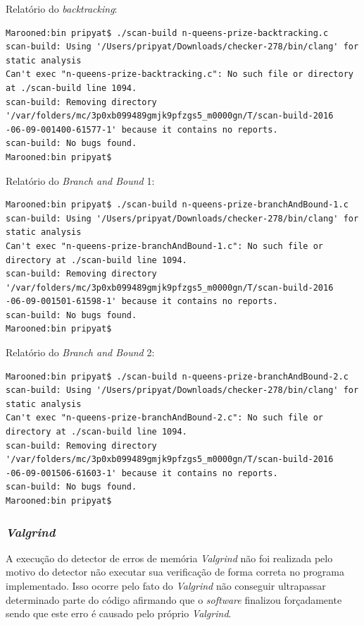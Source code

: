 \documentclass[12pt]{article}
\begin{document}
		Relatório do \textit{backtracking}:
{\scriptsize
\begin{verbatim}
Marooned:bin pripyat$ ./scan-build n-queens-prize-backtracking.c
scan-build: Using '/Users/pripyat/Downloads/checker-278/bin/clang' for static analysis
Can't exec "n-queens-prize-backtracking.c": No such file or directory at ./scan-build line 1094.
scan-build: Removing directory '/var/folders/mc/3p0xb099489gmjk9pfzgs5_m0000gn/T/scan-build-2016
-06-09-001400-61577-1' because it contains no reports.
scan-build: No bugs found.
Marooned:bin pripyat$
\end{verbatim}
}
		Relatório do \textit{Branch and Bound} 1:
{\scriptsize
\begin{verbatim}
Marooned:bin pripyat$ ./scan-build n-queens-prize-branchAndBound-1.c
scan-build: Using '/Users/pripyat/Downloads/checker-278/bin/clang' for static analysis
Can't exec "n-queens-prize-branchAndBound-1.c": No such file or directory at ./scan-build line 1094.
scan-build: Removing directory '/var/folders/mc/3p0xb099489gmjk9pfzgs5_m0000gn/T/scan-build-2016
-06-09-001501-61598-1' because it contains no reports.
scan-build: No bugs found.
Marooned:bin pripyat$
\end{verbatim}
}
		Relatório do \textit{Branch and Bound} 2:
{\scriptsize
\begin{verbatim}
Marooned:bin pripyat$ ./scan-build n-queens-prize-branchAndBound-2.c
scan-build: Using '/Users/pripyat/Downloads/checker-278/bin/clang' for static analysis
Can't exec "n-queens-prize-branchAndBound-2.c": No such file or directory at ./scan-build line 1094.
scan-build: Removing directory '/var/folders/mc/3p0xb099489gmjk9pfzgs5_m0000gn/T/scan-build-2016
-06-09-001506-61603-1' because it contains no reports.
scan-build: No bugs found.
Marooned:bin pripyat$
\end{verbatim}
}

	\subsubsection{\textit{Valgrind}}
		A execução do detector de erros de memória \textit{Valgrind} não foi realizada pelo motivo do detector não executar sua verificação de forma correta no programa implementado. Isso ocorre pelo fato do \textit{Valgrind} não conseguir ultrapassar determinado parte do código afirmando que o \textit{software} finalizou forçadamente sendo que este erro é causado pelo próprio \textit{Valgrind}.
\end{document}
